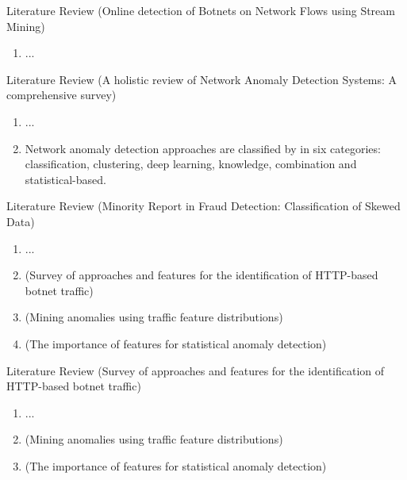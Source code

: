 \documentclass[newPxFont, numfooter, sectionpages]{beamer}
\begin{document}
\begin{frame}[c]{Literature Review}
	\cite{da2018online} (Online detection of Botnets on Network Flows using Stream Mining)
	\begin{enumerate}
		\item ...
	\end{enumerate}
\end{frame}

\begin{frame}[c]{Literature Review}
	\cite{moustafa2019holistic} (A holistic review of Network Anomaly Detection Systems: A comprehensive survey)
	\begin{enumerate}
		\item ...
		\item Network anomaly detection approaches are classified by \cite{moustafa2019holistic} in six categories: classification, clustering, deep learning, knowledge, combination and statistical-based.
	\end{enumerate}	
\end{frame}

\begin{frame}[c]{Literature Review}
	\cite{Phua2004minority} (Minority Report in Fraud Detection: Classification of Skewed Data)
	\begin{enumerate}
		\item ...
		\item \cite{acarali2016survey} (Survey of approaches and features for the identification of HTTP-based botnet traffic)
		\item \cite{lakhina2005mining} (Mining anomalies using traffic feature distributions)
		\item \cite{goldberg2015importance} (The importance of features for statistical anomaly detection)
	\end{enumerate}	
\end{frame}

\begin{frame}[c]{Literature Review}
	\cite{acarali2016survey} (Survey of approaches and features for the identification of HTTP-based botnet traffic)
	\begin{enumerate}
		\item ...
		\item \cite{lakhina2005mining} (Mining anomalies using traffic feature distributions)
		\item \cite{goldberg2015importance} (The importance of features for statistical anomaly detection)
	\end{enumerate}	
\end{frame}
\end{document}
